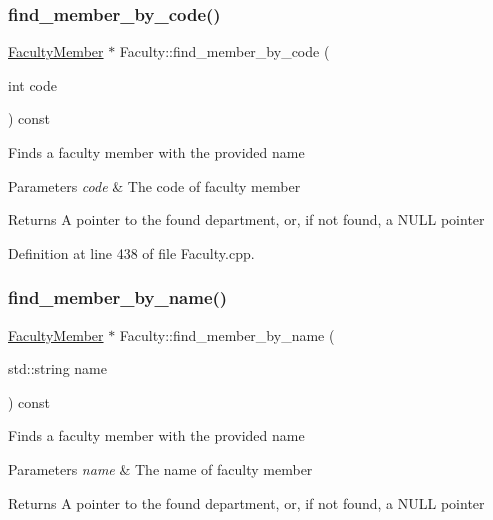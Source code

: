 \subsubsection{\texorpdfstring{find\+\_\+member\+\_\+by\+\_\+code()}{find\_member\_by\_code()}}
{\footnotesize\ttfamily \hyperlink{classFacultyMember}{Faculty\+Member} $\ast$ Faculty\+::find\+\_\+member\+\_\+by\+\_\+code (\begin{DoxyParamCaption}\item[{int}]{code }\end{DoxyParamCaption}) const}

Finds a faculty member with the provided name 
\begin{DoxyParams}{Parameters}
{\em code} & The code of faculty member \\
\hline
\end{DoxyParams}
\begin{DoxyReturn}{Returns}
A pointer to the found department, or, if not found, a N\+U\+LL pointer 
\end{DoxyReturn}


Definition at line 438 of file Faculty.\+cpp.

\mbox{\label{classFaculty_ae5b2d7446d9a91bdc1599fee00ee4e6a}} 
\subsubsection{\texorpdfstring{find\+\_\+member\+\_\+by\+\_\+name()}{find\_member\_by\_name()}}
{\footnotesize\ttfamily \hyperlink{classFacultyMember}{Faculty\+Member} $\ast$ Faculty\+::find\+\_\+member\+\_\+by\+\_\+name (\begin{DoxyParamCaption}\item[{std\+::string}]{name }\end{DoxyParamCaption}) const}

Finds a faculty member with the provided name 
\begin{DoxyParams}{Parameters}
{\em name} & The name of faculty member \\
\hline
\end{DoxyParams}
\begin{DoxyReturn}{Returns}
A pointer to the found department, or, if not found, a N\+U\+LL pointer 
\end{DoxyReturn}


